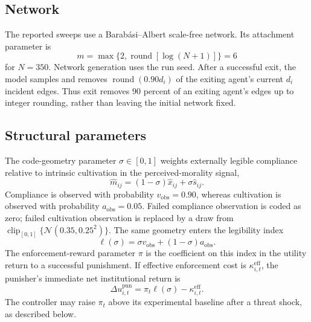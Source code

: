 \documentclass[12pt]{article}
\begin{document}
\subsection{Network}

The reported sweeps use a Barab\'asi--Albert scale-free network. Its attachment parameter is
\begin{equation}
 m=\max\{2,\operatorname{round}[\log(N+1)]\}=6
\end{equation}
for \(N=350\). Network generation uses the run seed. After a successful exit, the model samples and removes \(\operatorname{round}(0.90d_i)\) of the exiting agent's current \(d_i\) incident edges. Thus exit removes 90 percent of an exiting agent's edges up to integer rounding, rather than leaving the initial network fixed.

\subsection{Structural parameters}

The code-geometry parameter \(\sigma\in[0,1]\) weights externally legible compliance relative to intrinsic cultivation in the perceived-morality signal,
\begin{equation}
 \widehat m_{ij}=(1-\sigma)\widehat x_{ij}+\sigma\widehat s_{ij}.
\end{equation}
Compliance is observed with probability \(v_{\mathrm{obs}}=0.90\), whereas cultivation is observed with probability \(a_{\mathrm{obs}}=0.05\). Failed compliance observation is coded as zero; failed cultivation observation is replaced by a draw from \(\operatorname{clip}_{[0,1]}\{\mathcal{N}(0.35,0.25^2)\}\). The same geometry enters the legibility index
\begin{equation}
 \ell(\sigma)=\sigma v_{\mathrm{obs}}+(1-\sigma)a_{\mathrm{obs}}.
\end{equation}
The enforcement-reward parameter \(\pi\) is the coefficient on this index in the utility return to a successful punishment. If effective enforcement cost is \(\kappa_{i,t}^{\mathrm{eff}}\), the punisher's immediate net institutional return is
\begin{equation}
 \Delta u_{i,t}^{\mathrm{pun}}=\pi_t\ell(\sigma)-\kappa_{i,t}^{\mathrm{eff}}.
\end{equation}
The controller may raise \(\pi_t\) above its experimental baseline after a threat shock, as described below.
\end{document}
